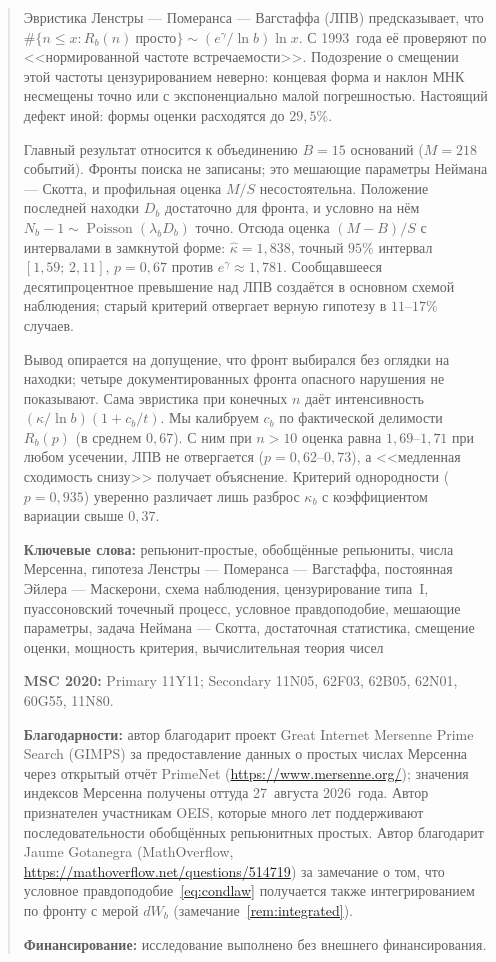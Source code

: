 \documentclass[11pt,a4paper]{article}
\theoremstyle{plain}
\theoremstyle{remark}
\newcommand{\Rb}{R_b}
\newcommand{\eg}{e^{\gamma}}
\DeclareMathOperator{\Pois}{Poisson}
\begin{document}
\begin{abstract}
Эвристика Ленстры --- Померанса --- Вагстаффа (ЛПВ) предсказывает, что
$\#\{n\le x:\Rb(n)\ \text{просто}\}\sim(\eg/\ln b)\ln x$. С 1993~года её проверяют
по <<нормированной частоте встречаемости>>. Подозрение о смещении этой частоты
цензурированием неверно: концевая форма и наклон МНК несмещены точно или с
экспоненциально малой погрешностью. Настоящий дефект иной: формы оценки
расходятся до $29{,}5\%$.

Главный результат относится к объединению $B=15$ оснований ($M=218$ событий).
Фронты поиска не записаны; это мешающие параметры Неймана --- Скотта, и
профильная оценка $M/S$ несостоятельна. Положение последней находки $D_b$
достаточно для фронта, и условно на нём $N_b-1\sim\Pois(\lambda_bD_b)$ точно.
Отсюда оценка $(M-B)/S$ с интервалами в замкнутой форме: $\hat\kappa=1{,}838$,
точный $95\%$ интервал $[1{,}59;\,2{,}11]$, $p=0{,}67$ против
$\eg\approx1{,}781$. Сообщавшееся десятипроцентное превышение над ЛПВ создаётся
в основном схемой наблюдения; старый критерий отвергает верную гипотезу в
$11$--$17\%$ случаев.

Вывод опирается на допущение, что фронт выбирался без оглядки на находки; четыре
документированных фронта опасного нарушения не показывают. Сама эвристика при
конечных $n$ даёт интенсивность $(\kappa/\ln b)(1+c_b/t)$. Мы калибруем $c_b$
по фактической делимости $\Rb(p)$ (в среднем $0{,}67$). С ним при $n>10$
оценка равна $1{,}69$--$1{,}71$ при любом усечении, ЛПВ не отвергается
($p=0{,}62$--$0{,}73$), а <<медленная сходимость снизу>> получает объяснение.
Критерий однородности ($p=0{,}935$) уверенно различает лишь разброс $\kappa_b$ с
коэффициентом вариации свыше $0{,}37$.

\medskip
\noindent\textbf{Ключевые слова:} репьюнит-простые, обобщённые репьюниты,
числа Мерсенна, гипотеза Ленстры --- Померанса --- Вагстаффа, постоянная
Эйлера --- Маскерони, схема наблюдения, цензурирование типа~I, пуассоновский
точечный процесс, условное правдоподобие, мешающие параметры, задача
Неймана --- Скотта, достаточная
статистика, смещение оценки, мощность критерия, вычислительная теория чисел

\medskip
\noindent\textbf{MSC 2020:} Primary 11Y11; Secondary 11N05, 62F03, 62B05,
62N01, 60G55, 11N80.

\medskip
\noindent\textbf{Благодарности:} автор благодарит проект Great Internet Mersenne
Prime Search (GIMPS) за предоставление данных о простых числах Мерсенна через
открытый отчёт PrimeNet (\url{https://www.mersenne.org/}); значения индексов
Мерсенна получены оттуда 27~августа 2026~года. Автор признателен участникам
OEIS, которые много лет поддерживают последовательности обобщённых репьюнитных
простых. Автор благодарит Jaume Gotanegra (MathOverflow,
\url{https://mathoverflow.net/questions/514719}) за замечание о том, что условное
правдоподобие~\eqref{eq:condlaw} получается также интегрированием по фронту с
мерой $dW_b$ (замечание~\ref{rem:integrated}).

\medskip
\noindent\textbf{Финансирование:} исследование выполнено без внешнего
финансирования.
\end{abstract}
\end{document}
